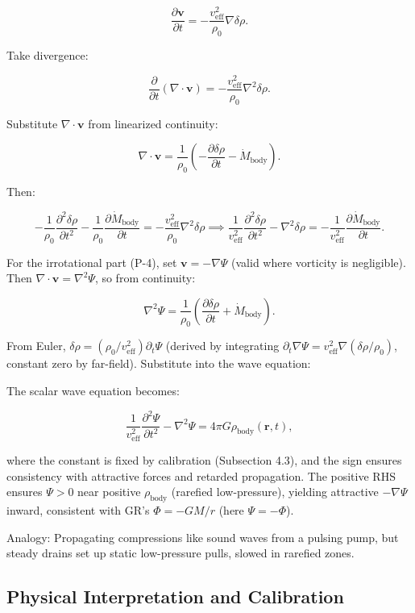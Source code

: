 \documentclass{article}
\begin{document}
\[
\frac{\partial \mathbf{v}}{\partial t} = -\frac{v_{\text{eff}}^2}{\rho_0} \nabla \delta \rho.
\]

Take divergence:

\[
\frac{\partial}{\partial t} (\nabla \cdot \mathbf{v}) = -\frac{v_{\text{eff}}^2}{\rho_0} \nabla^2 \delta \rho.
\]

Substitute $\nabla \cdot \mathbf{v}$ from linearized continuity:

\[
\nabla \cdot \mathbf{v} = \frac{1}{\rho_0} \left( -\frac{\partial \delta \rho}{\partial t} - \dot{M}_{\text{body}} \right).
\]

Then:

\[
-\frac{1}{\rho_0} \frac{\partial^2 \delta \rho}{\partial t^2} - \frac{1}{\rho_0} \frac{\partial \dot{M}_{\text{body}}}{\partial t} = -\frac{v_{\text{eff}}^2}{\rho_0} \nabla^2 \delta \rho \implies \frac{1}{v_{\text{eff}}^2} \frac{\partial^2 \delta \rho}{\partial t^2} - \nabla^2 \delta \rho = -\frac{1}{v_{\text{eff}}^2} \frac{\partial \dot{M}_{\text{body}}}{\partial t}.
\]

For the irrotational part (P-4), set $\mathbf{v} = -\nabla \Psi$ (valid where vorticity is negligible). Then $\nabla \cdot \mathbf{v} = \nabla^2 \Psi$, so from continuity:

\[
\nabla^2 \Psi = \frac{1}{\rho_0} \left( \frac{\partial \delta \rho}{\partial t} + \dot{M}_{\text{body}} \right).
\]

From Euler, $\delta \rho = (\rho_0 / v_{\text{eff}}^2) \partial_t \Psi$ (derived by integrating $\partial_t \nabla \Psi = v_{\text{eff}}^2 \nabla (\delta \rho / \rho_0)$, constant zero by far-field). Substitute into the wave equation:

The scalar wave equation becomes:

\[
\frac{1}{v_{\text{eff}}^2} \frac{\partial^2 \Psi}{\partial t^2} - \nabla^2 \Psi = 4\pi G \rho_{\text{body}}(\mathbf{r}, t),
\]

where the constant is fixed by calibration (Subsection 4.3), and the sign ensures consistency with attractive forces and retarded propagation. The positive RHS ensures $\Psi > 0$ near positive $\rho_{\text{body}}$ (rarefied low-pressure), yielding attractive $-\nabla \Psi$ inward, consistent with GR's $\Phi = -GM/r$ (here $\Psi = -\Phi$).

Analogy: Propagating compressions like sound waves from a pulsing pump, but steady drains set up static low-pressure pulls, slowed in rarefied zones.

\subsection{Physical Interpretation and Calibration}
\end{document}
